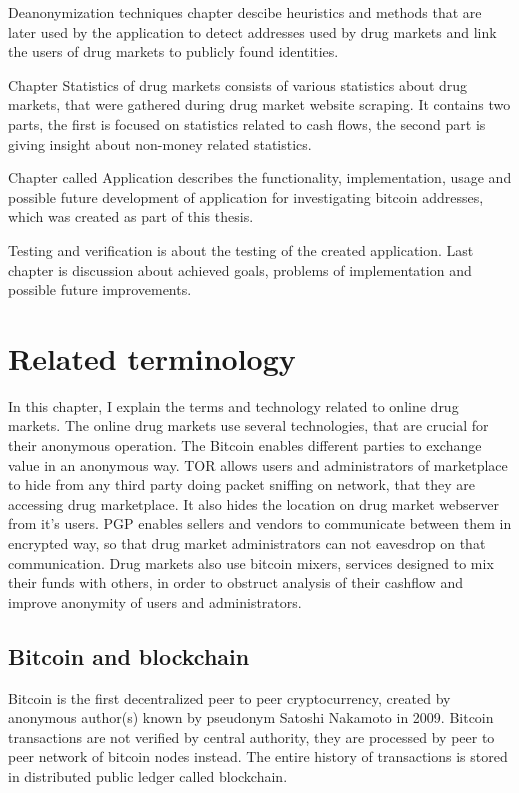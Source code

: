 \documentclass[
  digital, %
  table,   %
  lof,     %
  lot,     %
  oneside
]{fithesis3}
\begin{document}
Deanonymization techniques chapter descibe heuristics and methods that are later used by the application to detect 
addresses used by drug markets and link the users of drug markets to publicly found identities.

Chapter Statistics of drug markets consists of various statistics about drug markets, that were gathered during drug market website scraping.
It contains two parts, the first is focused on statistics related to cash flows, the second part is giving insight about non-money related statistics.

Chapter called Application describes the functionality, implementation, usage and 
possible future development of application for investigating bitcoin addresses, which was created as part of this thesis.

Testing and verification is about the testing of the created application.
Last chapter is discussion about achieved goals, problems of implementation and possible future improvements.

\chapter{Related terminology}

In this chapter, I explain the terms and technology related to online drug markets.
The online drug markets use several technologies, that are crucial for their anonymous operation.
The Bitcoin enables different parties to exchange value in an anonymous way.
TOR allows users and administrators of marketplace to hide from any third party doing packet sniffing on network,
that they are accessing drug marketplace. It also hides the location on drug market webserver from it's users.
PGP enables sellers and vendors to communicate between them in encrypted way,
so that drug market administrators can not eavesdrop on that communication.
Drug markets also use bitcoin mixers, services designed to mix their funds with others, in order to obstruct
analysis of their cashflow and improve anonymity of users and administrators.

\section{Bitcoin and blockchain}

Bitcoin is  the first decentralized peer to peer cryptocurrency, created by anonymous author(s) known by pseudonym Satoshi Nakamoto in 2009.
Bitcoin transactions are not verified by central authority, they are  
processed by peer to peer network of bitcoin nodes instead. 
The entire history of transactions is stored in distributed public ledger called blockchain.
\end{document}

